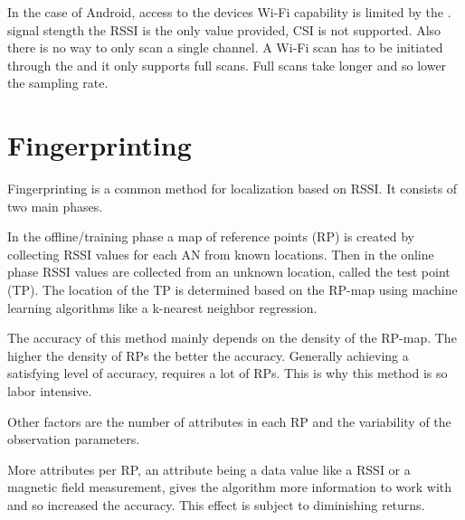 In the case of Android, access to the devices Wi-Fi capability is limited by the .  signal stength the RSSI is the only value provided, CSI is not supported. Also there is no way to only scan a single channel. A Wi-Fi scan has to be initiated through the  and it only supports full scans\cite{brouwers2014incremental}. Full scans take longer and so lower the sampling rate.







\section{Fingerprinting}

Fingerprinting is a common method for localization based on RSSI\cite{chapre2013RSSI}. It consists of two main phases.

In the offline/training phase a map of reference points (RP) is created by collecting RSSI values for each AN from known locations.
Then in the online phase RSSI values are collected from an unknown location, called the test point (TP). The location of the TP is determined based on the RP-map using machine learning algorithms like  a k-nearest neighbor regression\cite{JoseMaster}.

The accuracy of this method mainly depends on the density of the RP-map. The higher the density of RPs the better the accuracy. Generally achieving a satisfying level of accuracy, requires a lot of RPs. This is why this method is so labor intensive.

Other factors are the number of attributes in each RP and the variability of the observation parameters.

More attributes per RP, an attribute being a data value like a RSSI or a magnetic field measurement, gives the algorithm more information to work with and so increased the accuracy\cite{Li2012feasableMagnetic}. This effect is subject to diminishing returns\cite{brouwers2014incremental}.

